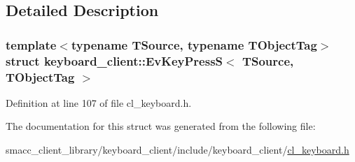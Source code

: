 \subsection{Detailed Description}
\subsubsection*{template$<$typename T\+Source, typename T\+Object\+Tag$>$\newline
struct keyboard\+\_\+client\+::\+Ev\+Key\+Press\+S$<$ T\+Source, T\+Object\+Tag $>$}



Definition at line 107 of file cl\+\_\+keyboard.\+h.



The documentation for this struct was generated from the following file\+:\begin{DoxyCompactItemize}
\item 
smacc\+\_\+client\+\_\+library/keyboard\+\_\+client/include/keyboard\+\_\+client/\hyperlink{cl__keyboard_8h}{cl\+\_\+keyboard.\+h}\end{DoxyCompactItemize}
